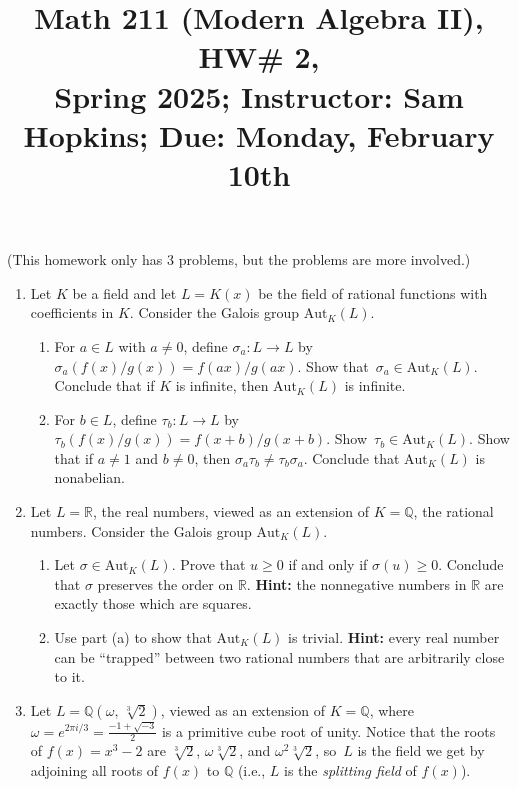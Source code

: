 \documentclass[11pt]{article}
\title{Math 211 (Modern Algebra II), HW\# 2, \\ {\normalsize Spring 2025; Instructor: Sam Hopkins; Due: Monday, February 10th}}
\date{}
\begin{document}
\maketitle

\thispagestyle{empty}

\noindent (This homework only has 3 problems, but the problems are more involved.)

\begin{enumerate}

\item Let $K$ be a field and let $L=K(x)$ be the field of rational functions with coefficients in $K$. Consider the Galois group $\mathrm{Aut}_{K}(L)$.
\begin{enumerate}
\item For $a \in L$ with $a \neq 0$, define $\sigma_a \colon L \to L$ by $\sigma_a( f(x) / g(x) ) = f(ax) / g(ax)$. Show that~$\sigma_a \in \mathrm{Aut}_{K}(L)$. Conclude that if $K$ is infinite, then $\mathrm{Aut}_{K}(L)$ is infinite.
\item For $b \in L$, define $\tau_b\colon L \to L$ by $\tau_b(f(x)/g(x)) = f(x+b) / g(x+b)$. Show~$\tau_b \in \mathrm{Aut}_{K}(L)$. Show that if $a \neq 1$ and $b \neq 0$, then $\sigma_a \tau_b \neq \tau_b \sigma_a$. Conclude that $\mathrm{Aut}_{K}(L)$ is nonabelian.
\end{enumerate}

\item Let $L=\mathbb{R}$, the real numbers, viewed as an extension of $K=\mathbb{Q}$, the rational numbers. Consider the Galois group $\mathrm{Aut}_{K}(L)$.
\begin{enumerate}
\item Let $\sigma \in \mathrm{Aut}_{K}(L)$. Prove that $u \geq 0$ if and only if $\sigma(u) \geq 0$. Conclude that $\sigma$ preserves the order on $\mathbb{R}$. {\bf Hint:} the nonnegative numbers in $\mathbb{R}$ are exactly those which are squares.
\item Use part (a) to show that $\mathrm{Aut}_{K}(L)$ is trivial. {\bf Hint:} every real number can be ``trapped'' between two rational numbers that are arbitrarily close to it.
\end{enumerate}

\item Let $L = \mathbb{Q}(\omega, \, \sqrt[3]{2})$, viewed as an extension of $K=\mathbb{Q}$, where $\omega = e^{2\pi i / 3} = \frac{-1+\sqrt{-3}}{2}$ is a primitive cube root of unity.  Notice that the roots of $f(x)=x^3-2$ are $\sqrt[3]{2}$, $\omega\sqrt[3]{2}$, and $\omega^2\sqrt[3]{2}$, so~$L$ is the field we get by adjoining all roots of $f(x)$ to $\mathbb{Q}$ (i.e., $L$ is the \emph{splitting field} of $f(x)$).


\end{enumerate}
\end{document}
